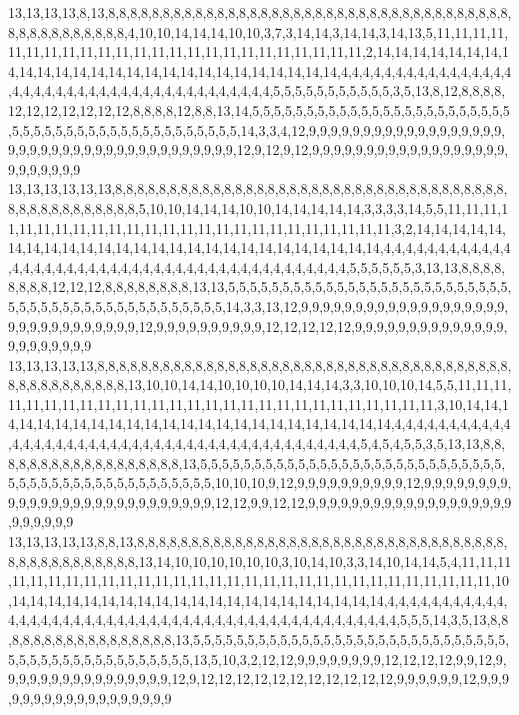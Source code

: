 13,13,13,13,8,13,8,8,8,8,8,8,8,8,8,8,8,8,8,8,8,8,8,8,8,8,8,8,8,8,8,8,8,8,8,8,8,8,8,8,8,8,8,8,8,8,8,8,8,8,8,8,8,8,4,10,10,14,14,14,10,10,3,7,3,14,14,3,14,14,3,14,13,5,11,11,11,11,11,11,11,11,11,11,11,11,11,11,11,11,11,11,11,11,11,11,11,11,2,14,14,14,14,14,14,14,14,14,14,14,14,14,14,14,14,14,14,14,14,14,14,14,14,14,14,4,4,4,4,4,4,4,4,4,4,4,4,4,4,4,4,4,4,4,4,4,4,4,4,4,4,4,4,4,4,4,4,4,4,4,4,4,4,4,4,5,5,5,5,5,5,5,5,5,5,5,3,5,13,8,12,8,8,8,8,12,12,12,12,12,12,12,8,8,8,8,12,8,8,13,14,5,5,5,5,5,5,5,5,5,5,5,5,5,5,5,5,5,5,5,5,5,5,5,5,5,5,5,5,5,5,5,5,5,5,5,5,5,5,5,5,5,5,5,5,5,14,3,3,4,12,9,9,9,9,9,9,9,9,9,9,9,9,9,9,9,9,9,9,9,9,9,9,9,9,9,9,9,9,9,9,9,9,9,9,9,9,9,9,9,12,9,12,9,12,9,9,9,9,9,9,9,9,9,9,9,9,9,9,9,9,9,9,9,9,9,9,9,9,9
13,13,13,13,13,13,8,8,8,8,8,8,8,8,8,8,8,8,8,8,8,8,8,8,8,8,8,8,8,8,8,8,8,8,8,8,8,8,8,8,8,8,8,8,8,8,8,8,8,8,8,8,8,8,5,10,10,14,14,14,10,10,14,14,14,14,14,3,3,3,3,14,5,5,11,11,11,11,11,11,11,11,11,11,11,11,11,11,11,11,11,11,11,11,11,11,11,11,11,3,2,14,14,14,14,14,14,14,14,14,14,14,14,14,14,14,14,14,14,14,14,14,14,14,14,14,14,4,4,4,4,4,4,4,4,4,4,4,4,4,4,4,4,4,4,4,4,4,4,4,4,4,4,4,4,4,4,4,4,4,4,4,4,4,4,4,4,4,4,4,5,5,5,5,5,5,3,13,13,8,8,8,8,8,8,8,8,12,12,12,8,8,8,8,8,8,8,8,13,13,5,5,5,5,5,5,5,5,5,5,5,5,5,5,5,5,5,5,5,5,5,5,5,5,5,5,5,5,5,5,5,5,5,5,5,5,5,5,5,5,5,5,5,5,5,5,14,3,3,13,12,9,9,9,9,9,9,9,9,9,9,9,9,9,9,9,9,9,9,9,9,9,9,9,9,9,9,9,9,9,9,9,12,9,9,9,9,9,9,9,9,9,9,12,12,12,12,12,9,9,9,9,9,9,9,9,9,9,9,9,9,9,9,9,9,9,9,9,9,9
13,13,13,13,13,8,8,8,8,8,8,8,8,8,8,8,8,8,8,8,8,8,8,8,8,8,8,8,8,8,8,8,8,8,8,8,8,8,8,8,8,8,8,8,8,8,8,8,8,8,8,8,8,8,13,10,10,14,14,10,10,10,10,14,14,14,3,3,10,10,10,14,5,5,11,11,11,11,11,11,11,11,11,11,11,11,11,11,11,11,11,11,11,11,11,11,11,11,11,11,11,3,10,14,14,14,14,14,14,14,14,14,14,14,14,14,14,14,14,14,14,14,14,14,14,14,14,4,4,4,4,4,4,4,4,4,4,4,4,4,4,4,4,4,4,4,4,4,4,4,4,4,4,4,4,4,4,4,4,4,4,4,4,4,4,4,4,4,4,4,5,4,5,4,5,5,3,5,13,13,8,8,8,8,8,8,8,8,8,8,8,8,8,8,8,8,8,8,13,5,5,5,5,5,5,5,5,5,5,5,5,5,5,5,5,5,5,5,5,5,5,5,5,5,5,5,5,5,5,5,5,5,5,5,5,5,5,5,5,5,5,5,5,5,5,5,10,10,10,9,12,9,9,9,9,9,9,9,9,9,9,12,9,9,9,9,9,9,9,9,9,9,9,9,9,9,9,9,9,9,9,9,9,9,9,9,9,9,9,12,12,9,9,12,12,9,9,9,9,9,9,9,9,9,9,9,9,9,9,9,9,9,9,9,9,9,9,9,9,9
13,13,13,13,13,8,8,13,8,8,8,8,8,8,8,8,8,8,8,8,8,8,8,8,8,8,8,8,8,8,8,8,8,8,8,8,8,8,8,8,8,8,8,8,8,8,8,8,8,8,8,8,8,8,13,14,10,10,10,10,10,10,3,10,14,10,3,3,14,10,14,14,5,4,11,11,11,11,11,11,11,11,11,11,11,11,11,11,11,11,11,11,11,11,11,11,11,11,11,11,11,11,11,11,10,14,14,14,14,14,14,14,14,14,14,14,14,14,14,14,14,14,14,14,14,14,4,4,4,4,4,4,4,4,4,4,4,4,4,4,4,4,4,4,4,4,4,4,4,4,4,4,4,4,4,4,4,4,4,4,4,4,4,4,4,4,4,4,4,4,4,4,4,5,5,5,14,3,5,13,8,8,8,8,8,8,8,8,8,8,8,8,8,8,8,8,8,13,5,5,5,5,5,5,5,5,5,5,5,5,5,5,5,5,5,5,5,5,5,5,5,5,5,5,5,5,5,5,5,5,5,5,5,5,5,5,5,5,5,5,5,5,5,5,13,5,10,3,2,12,12,9,9,9,9,9,9,9,9,12,12,12,12,9,9,12,9,9,9,9,9,9,9,9,9,9,9,9,9,9,9,9,12,9,12,12,12,12,12,12,12,12,12,12,12,9,9,9,9,9,9,12,9,9,9,9,9,9,9,9,9,9,9,9,9,9,9,9,9,9
